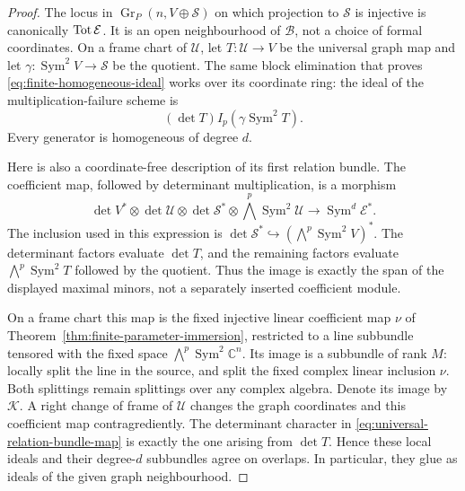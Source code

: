 \documentclass[11pt,reqno]{amsart}
\numberwithin{equation}{section}
\theoremstyle{definition}\newtheorem{definition}[theorem]{Definition}
\theoremstyle{remark}\newtheorem{remark}[theorem]{Remark}
\newcommand{\C}{\mathbb C}\newcommand{\Q}{\mathbb Q}
\DeclareMathOperator{\Sym}{Sym}\DeclareMathOperator{\Gr}{Gr}
\begin{document}
\begin{proof}
The locus in \(\Gr_P(n,V\oplus\mathcal S)\) on which projection
to \(\mathcal S\) is injective is canonically \(\operatorname{Tot}\mathcal E\).
It is an open neighbourhood of \(\mathcal B\), not a choice of
formal coordinates.  On a frame chart of \(\mathcal U\), let
\(T:\mathcal U\to V\) be the universal graph map and let
\(\gamma:\Sym^2V\to\mathcal S\) be the quotient.  The same
block elimination that proves
\eqref{eq:finite-homogeneous-ideal} works over its coordinate ring:
the ideal of the multiplication-failure scheme is
\[
                   (\det T)I_p(\gamma\Sym^2T).
\]
Every generator is homogeneous of degree \(d\).

Here is also a coordinate-free description of its first relation
bundle.  The coefficient map, followed by determinant multiplication,
is a morphism
\begin{equation}\label{eq:universal-relation-bundle-map}
 \det V^*\otimes\det\mathcal U\otimes\det\mathcal S^*
       \otimes\bigwedge^p\Sym^2\mathcal U
 \longrightarrow \Sym^d\mathcal E^*.
\end{equation}
The inclusion used in this expression is
\(\det\mathcal S^*\hookrightarrow(\bigwedge^p\Sym^2V)^*\).
The determinant factors evaluate \(\det T\), and the remaining
factors evaluate \(\bigwedge^p\Sym^2T\) followed by the quotient.
Thus the image is exactly the span of the displayed maximal minors,
not a separately inserted coefficient module.

On a frame chart this map is the fixed injective linear coefficient
map \(\nu\) of Theorem~\ref{thm:finite-parameter-immersion},
restricted to a line subbundle tensored with the fixed space
\(\bigwedge^p\Sym^2\C^n\).  Its image is a subbundle of rank
\(M\): locally split the line in the source, and split the fixed
complex linear inclusion \(\nu\).  Both splittings remain
splittings over any complex algebra.  Denote its image by
\(\mathcal K\).  A right change of frame of \(\mathcal U\)
changes the graph coordinates and this coefficient map
contragrediently.  The determinant character in
\eqref{eq:universal-relation-bundle-map} is exactly the one arising
from \(\det T\).  Hence these local ideals and their degree-\(d\)
subbundles agree on overlaps.  In particular, they glue as ideals
of the given graph neighbourhood.


\end{proof}
\end{document}
